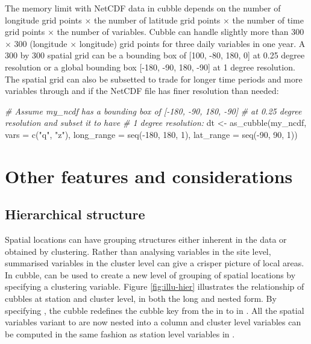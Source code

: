 \documentclass{article}
\newenvironment{Shaded}{\begin{snugshade}}{\end{snugshade}}
\newcommand{\AttributeTok}[1]{\textcolor[rgb]{0.77,0.63,0.00}{#1}}
\newcommand{\CommentTok}[1]{\textcolor[rgb]{0.56,0.35,0.01}{\textit{#1}}}
\newcommand{\DecValTok}[1]{\textcolor[rgb]{0.00,0.00,0.81}{#1}}
\newcommand{\FunctionTok}[1]{\textcolor[rgb]{0.00,0.00,0.00}{#1}}
\newcommand{\NormalTok}[1]{#1}
\newcommand{\OtherTok}[1]{\textcolor[rgb]{0.56,0.35,0.01}{#1}}
\newcommand{\SpecialCharTok}[1]{\textcolor[rgb]{0.00,0.00,0.00}{#1}}
\newcommand{\StringTok}[1]{\textcolor[rgb]{0.31,0.60,0.02}{#1}}
\begin{document}
The memory limit with NetCDF data in cubble depends on the number of longitude grid points \(\times\) the number of latitude grid points \(\times\) the number of time grid points \(\times\) the number of variables. Cubble can handle slightly more than 300 \(\times\) 300 (longitude \(\times\) longitude) grid points for three daily variables in one year. A 300 by 300 spatial grid can be a bounding box of {[}100, -80, 180, 0{]} at 0.25 degree resolution or a global bounding box {[}-180, -90, 180, -90{]} at 1 degree resolution. The spatial grid can also be subsetted to trade for longer time periods and more variables through  and  if the NetCDF file has finer resolution than needed:

\begin{Shaded}
\begin{Highlighting}[]
\CommentTok{\# Assume my\_ncdf has a bounding box of [{-}180, {-}90, 180, {-}90]}
\CommentTok{\# at 0.25 degree resolution and subset it to have}
\CommentTok{\# 1 degree resolution:}
\NormalTok{dt }\OtherTok{\textless{}{-}} \FunctionTok{as\_cubble}\NormalTok{(my\_ncdf, }\AttributeTok{vars =} \FunctionTok{c}\NormalTok{(}\StringTok{"q"}\NormalTok{, }\StringTok{"z"}\NormalTok{),}
                \AttributeTok{long\_range =} \FunctionTok{seq}\NormalTok{(}\SpecialCharTok{{-}}\DecValTok{180}\NormalTok{, }\DecValTok{180}\NormalTok{, }\DecValTok{1}\NormalTok{),}
                \AttributeTok{lat\_range =} \FunctionTok{seq}\NormalTok{(}\SpecialCharTok{{-}}\DecValTok{90}\NormalTok{, }\DecValTok{90}\NormalTok{, }\DecValTok{1}\NormalTok{))}
\end{Highlighting}
\end{Shaded}

\hypertarget{others}{%
\section{Other features and considerations}\label{others}}

\hypertarget{hierarchical-structure}{%
\subsection{Hierarchical structure}\label{hierarchical-structure}}

Spatial locations can have grouping structures either inherent in the data or obtained by clustering. Rather than analysing variables in the site level, summarised variables in the cluster level can give a crisper picture of local areas. In cubble,  can be used to create a new level of grouping of spatial locations by specifying a clustering variable. Figure \ref{fig:illu-hier} illustrates the relationship of cubbles at station and cluster level, in both the long and nested form. By specifying , the cubble redefines the cubble key from the  in  to  in . All the spatial variables variant to  are now nested into a  column and cluster level variables can be computed in the same fashion as station level variables in .
\end{document}
